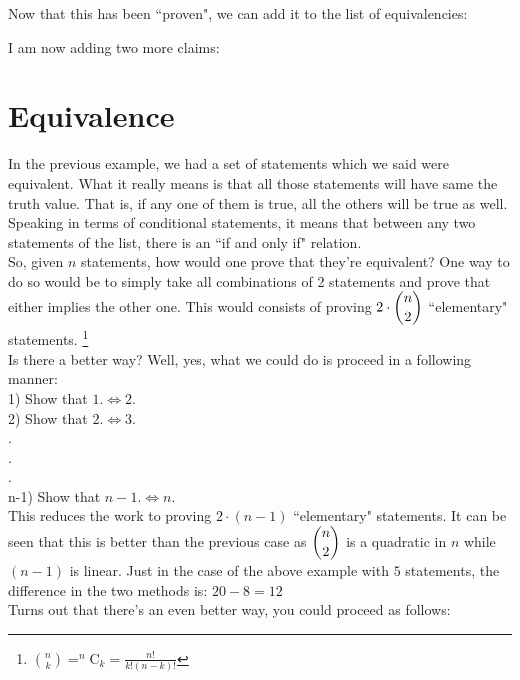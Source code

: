Now that this has been ``proven", we can add it to the list of equivalencies:

I am now adding two more claims:
%
\section{Equivalence}\label{sec:equiv}
In the previous example, we had a set of statements which we said were equivalent. What it really means is that all those statements will have same the truth value. That is, if any one of them is true, all the others will be true as well. Speaking in terms of conditional statements, it means that between any two statements of the list, there is an ``if and only if" relation.\\
So, given $n$ statements, how would one prove that they're equivalent? One way to do so would be to simply take all combinations of 2 statements and prove that either implies the other one. This would consists of proving $2\cdot\dbinom{n}{2}$ ``elementary" statements.
\footnote{$\binom{n}{k} = ^{n}$C$_k=\frac{n!}{k!(n-k)!}$}
\\
Is there a better way? Well, yes, what we could do is proceed in a following manner:\\
1) Show that $1.\iff 2.$\\
2) Show that $2. \iff 3.$\\
.\\
.\\
.\\
n-1) Show that $n-1. \iff n.$\\
This reduces the work to proving $2\cdot(n-1)$ ``elementary" statements. It can be seen that this is better than the previous case as $\dbinom{n}{2}$ is a quadratic in $n$ while $(n-1)$ is linear. Just in the case of the above example with $5$ statements, the difference in the two methods is: $20 - 8 = 12$\\
Turns out that there's an even better way, you could proceed as follows:\\
